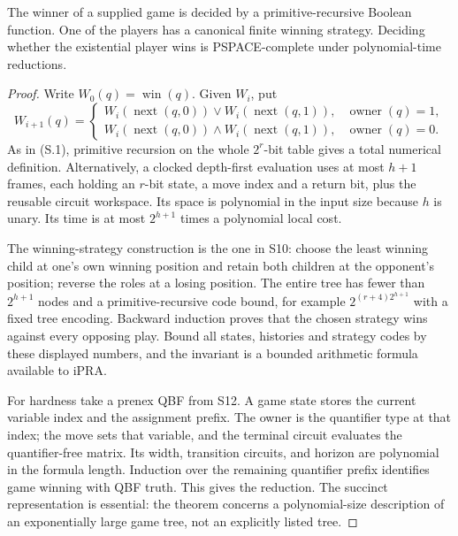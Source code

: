 \begin{theorem}
\label{thm:S13}
The winner of a supplied game is decided by a primitive-recursive
Boolean function.  One of the players has a canonical finite winning
strategy.  Deciding whether the existential player wins is PSPACE-complete
under polynomial-time reductions.
\end{theorem}
\begin{proof}
Write $W_0(q)=\operatorname{win}(q)$.  Given $W_i$, put
\[
 W_{i+1}(q)=
 \begin{cases}
 W_i(\operatorname{next}(q,0))\vee
 W_i(\operatorname{next}(q,1)),&\operatorname{owner}(q)=1,\\
 W_i(\operatorname{next}(q,0))\wedge
 W_i(\operatorname{next}(q,1)),&\operatorname{owner}(q)=0.
 \end{cases}
 \tag{S.10}
\]
As in (S.1), primitive recursion on the whole $2^r$-bit table gives
a total numerical definition.  Alternatively, a clocked depth-first
evaluation uses at most $h+1$ frames, each holding an $r$-bit state,
a move index and a return bit, plus the reusable circuit workspace.
Its space is polynomial in the input size because $h$ is unary.
Its time is at most $2^{h+1}$ times a polynomial local cost.

The winning-strategy construction is the one in S10: choose the least
winning child at one's own winning position and retain both children
at the opponent's position; reverse the roles at a losing position.
The entire tree has fewer than $2^{h+1}$ nodes and a primitive-recursive
code bound, for example $2^{(r+4)2^{h+1}}$ with a fixed tree encoding.
Backward induction proves that the chosen strategy wins against every
opposing play.  Bound all states, histories and strategy codes by
these displayed numbers, and the invariant is a bounded arithmetic
formula available to iPRA.

For hardness take a prenex QBF from S12.  A game state stores the
current variable index and the assignment prefix.  The owner is the
quantifier type at that index; the move sets that variable, and the
terminal circuit evaluates the quantifier-free matrix.  Its width,
transition circuits, and horizon are polynomial in the formula length.
Induction over the remaining quantifier prefix identifies game winning
with QBF truth.  This gives the reduction.  The succinct representation
is essential: the theorem concerns a polynomial-size description of
an exponentially large game tree, not an explicitly listed tree.
\end{proof}


